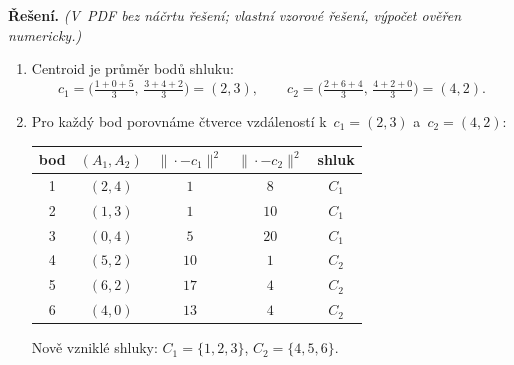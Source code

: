 \medskip
\noindent\textbf{Řešení.} \textit{(V~PDF bez náčrtu řešení; vlastní vzorové řešení, výpočet ověřen numericky.)}\par
\begin{enumerate}
  \item Centroid je průměr bodů shluku:
    \[
      c_1 = \Big(\tfrac{1+0+5}{3},\,\tfrac{3+4+2}{3}\Big) = (2,3),\qquad
      c_2 = \Big(\tfrac{2+6+4}{3},\,\tfrac{4+2+0}{3}\Big) = (4,2).
    \]
  \item Pro každý bod porovnáme čtverce vzdáleností k~$c_1=(2,3)$ a~$c_2=(4,2)$:
    \begin{center}
    \begin{tabular}{ccccc}
    \toprule
    bod & $(A_1,A_2)$ & $\|\cdot - c_1\|^2$ & $\|\cdot - c_2\|^2$ & shluk \\
    \midrule
    1 & $(2,4)$ & $1$  & $8$  & $C_1$ \\
    2 & $(1,3)$ & $1$  & $10$ & $C_1$ \\
    3 & $(0,4)$ & $5$  & $20$ & $C_1$ \\
    4 & $(5,2)$ & $10$ & $1$  & $C_2$ \\
    5 & $(6,2)$ & $17$ & $4$  & $C_2$ \\
    6 & $(4,0)$ & $13$ & $4$  & $C_2$ \\
    \bottomrule
    \end{tabular}
    \end{center}
    Nově vzniklé shluky: $C_1 = \{1,2,3\}$, $C_2 = \{4,5,6\}$.
\end{enumerate}

